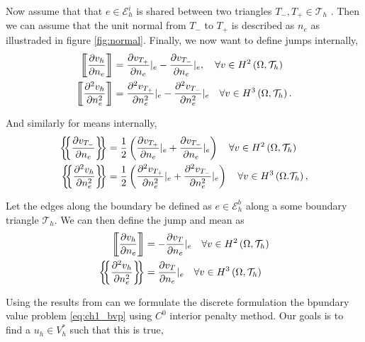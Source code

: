 Now assume that that $e \in \mathcal{E}_{h}^{i} $ is shared between two triangles $T_{-}, T_{+} \in  \mathcal{T} _{h}$ .
Then we can assume that the unit normal from $T_{-}$ to $T_{+}$ is described as $n_{e}$ as illustraded in figure
\ref{fig:normal}. Finally, we now want to define jumps internally, \[
\begin{split}
    \jump{ \frac{\partial v_{h}}{\partial n_{e}} } &= \frac{\partial v_{T_{+}}}{\partial n_{e}  } | _{e} -
    \frac{\partial v_{T_{-}}}{\partial n_{e}  } |_{e}, \quad \forall v \in H^{2}\left( \Omega , \mathcal{T} _{h} \right)  \\
    \jump{ \frac{\partial ^2 v_{h}}{\partial n_{e} ^2 } } &= \frac{\partial ^2 v_{T_{+}}}{\partial  n_{e}^2} |_{e}  -
    \frac{\partial ^2 v_{T_{-}}}{\partial n_{e}^2   } |_{e} \quad \forall v \in H^3\left( \Omega , \mathcal{T} _{h}
    \right).  \\
\end{split}
\]

And similarly for means internally,
\[
    \begin{split}
\mean{ \frac{\partial v_{T_{-}}}{\partial n_{e} } } &= \frac{1}{2} \left( \frac{\partial v_{T_{+}}}{\partial n_{e} }
|_{e} +  \frac{\partial v_{T_{-}}}{\partial n_{e} } |_{e}  \right) \quad  \forall v \in H^2\left( \Omega , \mathcal{T}
_{h} \right) \\
    \mean{ \frac{\partial ^2 v_{h}}{\partial n_{e}^2 } } &= \frac{1}{2} \left( \frac{\partial ^2 v_{T_{+}}}{\partial
    n_{e}^2  } |_{e} + \frac{\partial ^2 v_{T_{-}}}{\partial n_{e}^2  } |_{e}    \right) \quad \forall v \in  H^3\left( \Omega .
\mathcal{T}_{h}  \right), \\
    \end{split}
\]

Let the edges along the boundary be defined as $e \in  \mathcal{E} _{h}^{b}$ along a some boundary triangle $\mathcal{T}
_{h}$. We can then define the jump and mean as \[
\begin{split}
    \jump{ \frac{\partial v_{h} }{\partial n_{e} } } & = -\frac{\partial v_{T}}{\partial  n_{e}} |_{e} \quad \forall v \in
    H^2\left( \Omega , \mathcal{T}_{h}  \right) \\
    \mean{ \frac{\partial ^2 v_{h}}{\partial n_{e}^2 } } & = \frac{\partial v_{T}}{\partial  n_{e}} |_{e} \quad \forall v \in
    H^3\left( \Omega  , \mathcal{T}_{h}  \right)
\end{split}
\]

Using the results from \cite{gu2012c0} can we formulate the discrete formulation the bpundary value problem
\eqref{eq:ch1_bvp} using $C^{0}$ interior penalty method. Our goals is to find a $u_{h} \in V_{h}^{*} $ such that this
is true,

